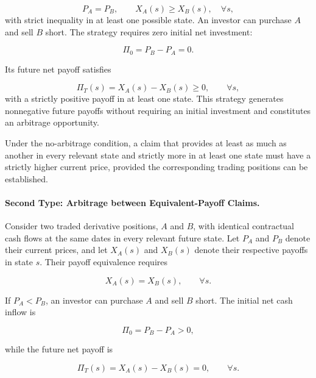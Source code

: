 \begin{equation}
P_A=P_B,
\qquad
X_A(s)\geq X_B(s), \quad \forall s,
\label{eq:ch11-payoff-dominance}
\end{equation}
with strict inequality in at least one possible
state. An investor can purchase $A$ and sell $B$
short. The strategy requires zero initial net
investment:

\begin{equation}
\Pi_0=P_B-P_A=0.
\end{equation}

Its future net payoff satisfies

\begin{equation}
\Pi_T(s)=X_A(s)-X_B(s)\geq 0,
\qquad \forall s,
\end{equation}
with a strictly positive payoff in at least
one state. This strategy generates nonnegative
future payoffs without requiring an initial
investment and constitutes an arbitrage
opportunity.

Under the no-arbitrage condition, a claim that
provides at least as much as another in every
relevant state and strictly more in at least one
state must have a strictly higher current price,
provided the corresponding trading positions
can be established.

\paragraph{Second Type: Arbitrage between Equivalent-Payoff Claims.}

Consider two traded derivative positions, $A$ and
$B$, with identical contractual cash flows at the
same dates in every relevant future state. Let
$P_A$ and $P_B$ denote their current prices, and
let $X_A(s)$ and $X_B(s)$ denote their respective
payoffs in state $s$. Their payoff equivalence
requires

\begin{equation}
X_A(s)=X_B(s),
\qquad \forall s.
\label{eq:ch11-equivalent-derivative-payoffs}
\end{equation}

If $P_A<P_B$, an investor can purchase $A$ and
sell $B$ short. The initial net cash inflow is

\begin{equation}
\Pi_0=P_B-P_A>0,
\end{equation}

while the future net payoff is

\begin{equation}
\Pi_T(s)=X_A(s)-X_B(s)=0,
\qquad \forall s.
\end{equation}

